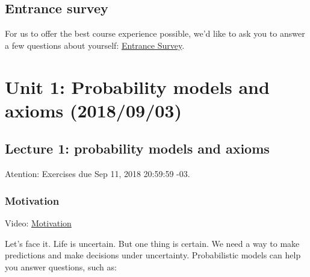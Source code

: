 \documentclass[pdftex, brazil, 12pt, twoside]{article}
\begin{document}
\subsection{Entrance survey}
\label{ovw0-survey}

For us to offer the best course experience possible, we'd like to ask you
to answer a few questions about yourself: \href{survey.pdf}{Entrance Survey}.




\newpage
\section{Unit 1: Probability models and axioms (2018/09/03)}
\label{un1}


\subsection{Lecture 1: probability models and axioms}
\label{un1-lec1}

Atention: Exercises due Sep 11, 2018 20:59:59 -03.

\subsubsection{Motivation}
\label{un1-lec1-motiv}

Video: \href{https://d2f1egay8yehza.cloudfront.net/MIT6041XT114-V036600\_DTH.mp4}{Motivation}

Let's face it.
Life is uncertain.
But one thing is certain.
We need a way to make predictions and make decisions
under uncertainty.
Probabilistic models can help you answer questions, such as:
\end{document}
